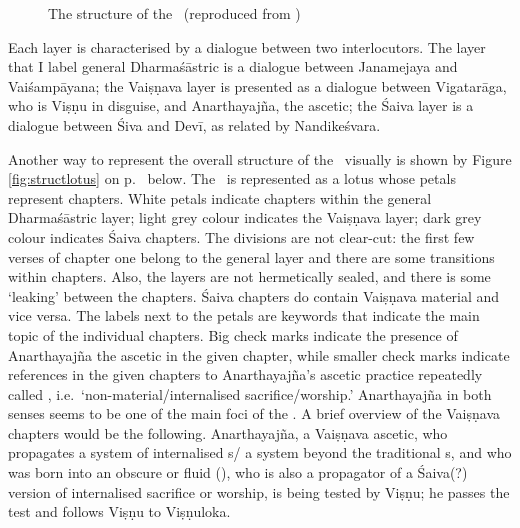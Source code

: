 \begin{figure}
\begin{tikzpicture}


\end{tikzpicture}
\caption[Structure of the \VSS]{The structure of the \VSS\ (reproduced from )\label{fig:struct2021}}
\end{figure}

Each layer is characterised by a dialogue between
two interlocutors. The layer that I label general 
Dharmaśāstric is a dialogue between Janamejaya and
Vaiśampāyana; the Vaiṣṇava layer is presented as
a dialogue between Vigatarāga, who is
Viṣṇu in disguise, and Anarthayajña, the ascetic;
the Śaiva layer is a dialogue between Śiva and Devī,
as related by Nandikeśvara.

Another way to represent the overall structure of the \VSS\
visually is shown by Figure \ref{fig:structlotus} 
on p.~\pageref{fig:structlotus} below. 
The \VSS\ is represented
as a lotus whose petals represent chapters. White petals indicate chapters within
the general Dharmaśāstric layer; light grey colour
indicates the Vaiṣṇava layer; dark grey colour indicates
Śaiva chapters. The divisions are not clear-cut: 
the first few verses of chapter one belong to
the general layer and there are some transitions
within chapters. Also, the layers are not hermetically
sealed, and there is some `leaking' between the chapters.
Śaiva chapters do contain Vaiṣṇava material and vice versa.
The labels next to the petals are keywords that indicate
the main topic of the individual chapters. Big check marks
indicate the presence of Anarthayajña the ascetic in
the given chapter, while smaller check marks indicate
references in the given chapters to Anarthayajña's
ascetic practice repeatedly called , 
i.e.\ `non-material\thinspace /\thinspace internali\-sed sacrifice/worship.'
Anarthayajña in both senses seems to be one of the 
main foci of the \VSS. A brief overview of 
the Vaiṣṇava chapters would be the following.
Anarthayajña, a Vaiṣṇava ascetic, who propagates 
a system of internalised s\thinspace /\thinspace
a system beyond the traditional \skt{āśrama}s, 
and who was born into an obscure or fluid  
(),
who is also a propagator of a Śaiva(?) version of 
internalised sacrifice or worship, is
being tested by Viṣṇu; he passes the test
and follows Viṣṇu to Viṣṇuloka.

